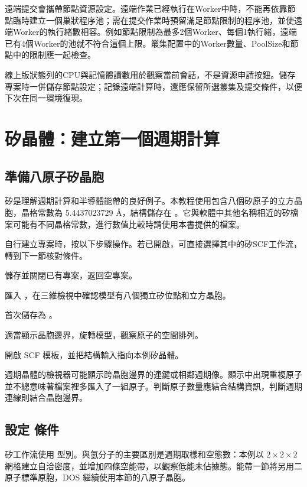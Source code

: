 遠端提交會攜帶節點資源設定。遠端作業已經執行在Worker中時，不能再依靠節點臨時建立一個巢狀程序池；需在提交作業時預留滿足節點限制的程序池，並使遠端Worker的執行緒數相容。例如節點限制為最多2個Worker、每個1執行緒，遠端已有4個Worker的池就不符合這個上限。叢集配置中的Worker數量、PoolSize和節點中的限制應一起檢查。

線上版狀態列的CPU與記憶體讀數用於觀察當前會話，不是資源申請按鈕。儲存專案時一併儲存節點設定；記錄遠端計算時，還應保留所選叢集及提交條件，以便下次在同一環境復現。


\section{矽晶體：建立第一個週期計算}

\subsection{準備八原子矽晶胞}

矽是理解週期計算和半導體能帶的良好例子。本教程使用包含八個矽原子的立方晶胞，晶格常數為 $5.4437023729$ Å，結構儲存在 。它與軟體中其他名稱相近的矽檔案可能有不同晶格常數，進行數值比較時請使用本書提供的檔案。

自行建立專案時，按以下步驟操作。若已開啟，可直接選擇其中的矽SCF工作流，轉到下一節核對條件。

\begin{steps}
\item 儲存並關閉已有專案，返回空專案。
\item 匯入 ，在三維檢視中確認模型有八個獨立矽位點和立方晶胞。
\item 首次儲存為 。
\item 適當顯示晶胞邊界，旋轉模型，觀察原子的空間排列。
\item 開啟 SCF 模板，並把結構輸入指向本例矽晶體。
\end{steps}

週期晶體的檢視器可能顯示跨晶胞邊界的連鍵或相鄰週期像。顯示中出現重複原子並不總意味著檔案裡多匯入了一組原子。判斷原子數量應結合結構資訊，判斷週期連線則結合晶胞邊界。


\subsection{設定  條件}

矽工作流使用  型別。與氫分子的主要區別是週期取樣和空態數：本例以 $2\times2\times2$ 網格建立自洽密度，並增加四條空能帶，以觀察低能未佔據態。能帶一節將另用二原子標準原胞，DOS 繼續使用本節的八原子晶胞。

